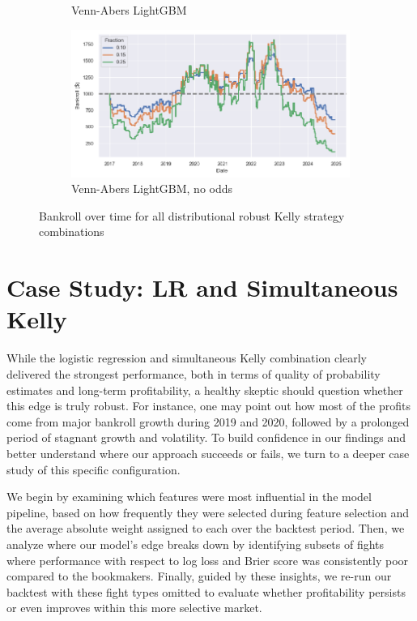\documentclass[12pt,twoside]{report}
\begin{document}
\begin{figure}[!htb]
\begin{subfigure}{.5\linewidth}
  \caption{Venn-Abers LightGBM}
\end{subfigure}%
\begin{subfigure}{.5\linewidth}
  \centering
  \includegraphics[width=\linewidth]{figures/bankroll_va_lightgbm_no_odds_distributional_robust.png}
  \caption{Venn-Abers LightGBM, no odds}
\end{subfigure}
\caption{Bankroll over time for all distributional robust Kelly strategy combinations}
\end{figure}



\section{Case Study: LR and Simultaneous Kelly}

While the logistic regression and simultaneous Kelly combination clearly delivered the strongest performance, both in terms of quality of probability estimates and long-term profitability, a healthy skeptic should question whether this edge is truly robust. For instance, one may point out how most of the profits come from major bankroll growth during 2019 and 2020, followed by a prolonged period of stagnant growth and volatility. To build confidence in our findings and better understand where our approach succeeds or fails, we turn to a deeper case study of this specific configuration.

We begin by examining which features were most influential in the model pipeline, based on how frequently they were selected during feature selection and the average absolute weight assigned to each over the backtest period. Then, we analyze where our model’s edge breaks down by identifying subsets of fights where performance with respect to log loss and Brier score was consistently poor compared to the bookmakers. Finally, guided by these insights, we re-run our backtest with these fight types omitted to evaluate whether profitability persists or even improves within this more selective market.
\end{document}
